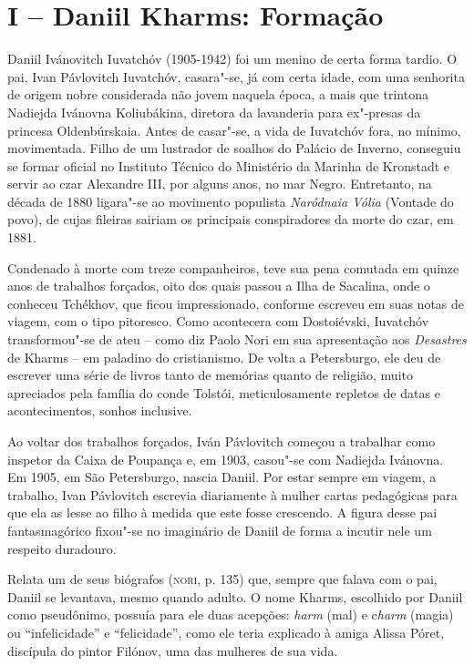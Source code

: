 \section{I -- Daniil Kharms: Formação}

Daniil Ivánovitch Iuvatchóv (1905-1942) foi um menino de certa forma
tardio. O pai, Ivan Pávlovitch Iuvatchóv, casara"-se, já com certa idade,
com uma senhorita de origem nobre considerada não jovem naquela época, a
mais que trintona Nadiejda Ivánovna Koliubákina, diretora da lavanderia
para ex"-presas da princesa Oldenbúrskaia. Antes de casar"-se, a vida de
Iuvatchóv fora, no mínimo, movimentada. Filho de um lustrador de soalhos
do Palácio de Inverno, conseguiu se formar oficial no Instituto Técnico
do Ministério da Marinha de Kronstadt e servir ao czar Alexandre III,
por alguns anos, no mar Negro. Entretanto, na década de 1880 ligara"-se
ao movimento populista \emph{Naródnaia Vólia} (Vontade do povo), de
cujas fileiras sairiam os principais conspiradores da morte do czar, em
1881.

Condenado à morte com treze companheiros, teve sua pena comutada em
quinze anos de trabalhos forçados, oito dos quais passou a Ilha de
Sacalina, onde o conheceu Tchékhov, que ficou impressionado, conforme
escreveu em suas notas de viagem, com o tipo pitoresco. Como acontecera
com Dostoiévski, Iuvatchóv transformou"-se de ateu -- como diz Paolo Nori
em sua apresentação aos \emph{Desastres} de Kharms -- em paladino do
cristianismo. De volta a Petersburgo, ele deu de escrever uma série de
livros tanto de memórias quanto de religião, muito apreciados pela
família do conde Tolstói, meticulosamente repletos de datas e
acontecimentos, sonhos inclusive.

Ao voltar dos trabalhos forçados, Iván Pávlovitch começou a trabalhar
como inspetor da Caixa de Poupança e, em 1903, casou"-se com Nadiejda
Ivánovna. Em 1905, em São Petersburgo, nascia Daniil. Por estar sempre
em viagem, a trabalho, Ivan Pávlovitch escrevia diariamente à mulher
cartas pedagógicas para que ela as lesse ao filho à medida que este
fosse crescendo. A figura desse pai fantasmagórico fixou"-se no
imaginário de Daniil de forma a incutir nele um respeito duradouro.

Relata um de seus biógrafos (\textsc{nori}, p. 135) que, sempre que
falava com o pai, Daniil se levantava, mesmo quando adulto. O nome
Kharms, escolhido por Daniil como pseudônimo, possuía para ele duas
acepções: \emph{harm} (mal) e c\emph{harm} (magia) ou ``infelicidade'' e
``felicidade'', como ele teria explicado à amiga Alissa Póret, discípula
do pintor Filónov, uma das mulheres de sua vida.

